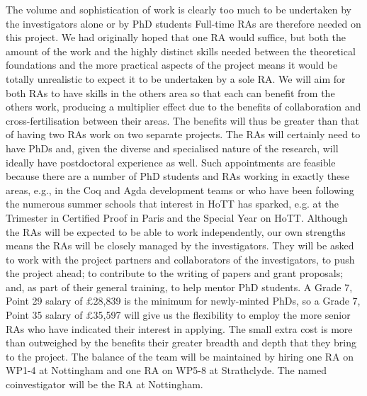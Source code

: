 \documentclass[a4paper,11pt]{article}
\begin{document}
The volume and sophistication of work is clearly too much to be
undertaken by the investigators alone or by PhD students%
Full-time RAs are therefore needed on this project. We had originally
hoped that one RA would suffice, but both the amount of the work and
the highly distinct skills needed between the theoretical foundations
and the more practical aspects of the project means it would be
totally unrealistic to expect it to be undertaken by a sole RA. We
will aim for both RAs to have skills in the others area so that each
can benefit from the others work, producing a multiplier effect due to
the benefits of collaboration and cross-fertilisation between their
areas. The benefits will thus be greater than that of having
two RAs work on two separate projects. The RAs will certainly need to
have PhDs and, given the diverse and specialised nature of the
research, will ideally have postdoctoral experience as well.  Such
appointments are feasible because there are a number of PhD students
and RAs working in exactly these areas, e.g., in the Coq and Agda
development teams or who have been following the
numerous summer schools that interest in HoTT has sparked, e.g. at the
Trimester in Certified Proof in Paris and the Special Year on HoTT.  Although the RAs will be expected to be able to work
independently, our own strengths means the RAs will be closely managed
by the investigators. They will be asked to work with the project
partners and collaborators of the investigators, to push the project
ahead; to contribute to the writing of papers and grant proposals;
and, as part of their general training, to help mentor PhD students. A
Grade 7, Point 29 salary of $\pounds$28,839 is the minimum for
newly-minted PhDs, so a Grade 7, Point 35 salary of $\pounds$35,597
will give us the flexibility to employ the more senior RAs who have
indicated their interest in applying. The small extra cost is more
than outweighed by the benefits their greater breadth and depth that
they bring to the project. The balance of the team will be maintained
by hiring one RA on WP1-4 at Nottingham and one RA on
WP5-8 at Strathclyde. The named coinvestigator will be the RA at Nottingham.



\vspace{0.02in}
\end{document}
